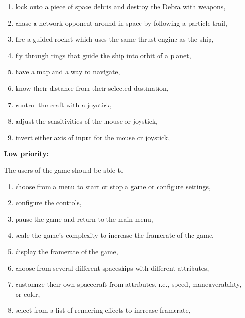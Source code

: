 \begin{multicols}{2}
\begin{enumerate}

  \item lock onto a piece of space debris and destroy the Debra with weapons,

  \item chase a network opponent around in space by following a particle trail,

  \item fire a guided rocket which uses the same thrust engine as the ship,

  \item fly through rings that guide the ship into orbit of a planet,

  \item have a map and a way to navigate,

  \item know their distance from their selected destination,

  \item control the craft with a joystick,

  \item adjust the sensitivities of the mouse or joystick,

  \item invert either axis of input for the mouse or joystick,

\end{enumerate}
\end{multicols}

\noindent \textbf{Low priority:}

The users of the game should be able to

\begin{multicols}{2}
\begin{enumerate}

  \item choose from a menu to start or stop a game or configure settings,

  \item configure the controls,

  \item pause the game and return to the main menu,

  \item scale the game's complexity to increase the framerate of the game,

  \item display the framerate of the game,

  \item choose from several different spaceships with different attributes,

  \item customize their own spacecraft from attributes, i.e., speed, maneuverability, or color,

  \item select from a list of rendering effects to increase framerate,

\end{enumerate}
\end{multicols}

